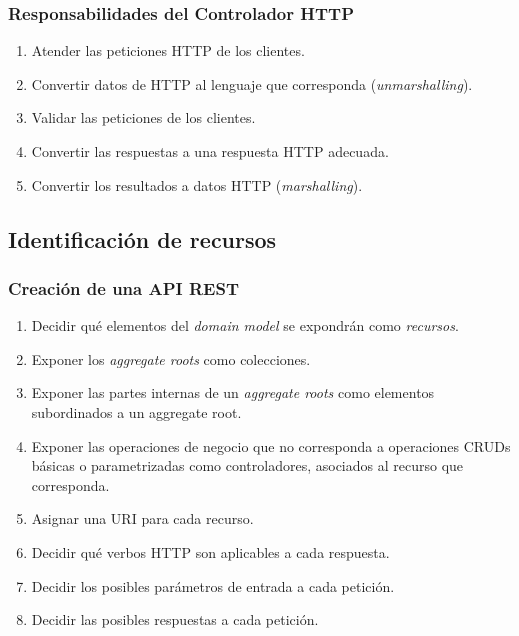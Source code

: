 \documentclass[a4paper,slidestop,xcolor=pst,blue]{beamer}
\begin{document}
\begin{frame}[c]
	\frametitle{Responsabilidades del Controlador HTTP}
	\begin{enumerate}[<+->]
        \item Atender las peticiones HTTP de los clientes.
        \item Convertir datos de HTTP al lenguaje que corresponda (\emph{unmarshalling}).
        \item Validar las peticiones de los clientes.
        \item Convertir las respuestas a una respuesta HTTP adecuada.
        \item Convertir los resultados a datos HTTP (\emph{marshalling}).
	\end{enumerate}
\end{frame}

\subsection{Identificación de recursos}

\begin{frame}[c]
    \frametitle{Creación de una API REST}
    \begin{enumerate}[<+->]
        \item Decidir qué elementos del \emph{domain model} se expondrán como \emph{recursos}.
        \item Exponer los \emph{aggregate roots} como colecciones.
        \item Exponer las partes internas de un \emph{aggregate roots} como elementos subordinados a un aggregate root.
        \item Exponer las operaciones de negocio que no corresponda a operaciones CRUDs básicas o parametrizadas como controladores, asociados al recurso que corresponda.
        \item Asignar una URI para cada recurso.
        \item Decidir qué verbos HTTP son aplicables a cada respuesta.
        \item Decidir los posibles parámetros de entrada a cada petición.
        \item Decidir las posibles respuestas a cada petición.
    \end{enumerate}
\end{frame}
\end{document}
